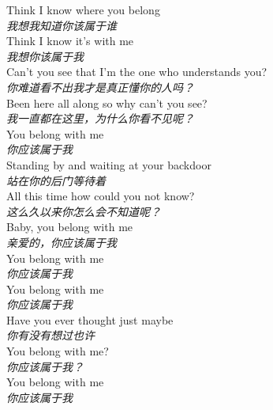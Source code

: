 \begin{spacing}{1.5}
\begin{flushleft}
Think I know where you belong\\
\textit{我想我知道你该属于谁}\\[0.5em]

Think I know it's with me\\
\textit{我想你该属于我}\\[0.5em]

Can't you see that I'm the one who understands you?\\
\textit{你难道看不出我才是真正懂你的人吗？}\\[0.5em]

Been here all along so why can't you see?\\
\textit{我一直都在这里，为什么你看不见呢？}\\[0.5em]

You belong with me\\
\textit{你应该属于我}\\[0.5em]

Standing by and waiting at your backdoor\\
\textit{站在你的后门等待着}\\[0.5em]

All this time how could you not know?\\
\textit{这么久以来你怎么会不知道呢？}\\[0.5em]

Baby, you belong with me\\
\textit{亲爱的，你应该属于我}\\[0.5em]

You belong with me\\
\textit{你应该属于我}\\[0.5em]

You belong with me\\
\textit{你应该属于我}\\[0.5em]

Have you ever thought just maybe\\
\textit{你有没有想过也许}\\[0.5em]

You belong with me?\\
\textit{你应该属于我？}\\[0.5em]

You belong with me\\
\textit{你应该属于我}\\[0.5em]
\end{flushleft}
\end{spacing} 
